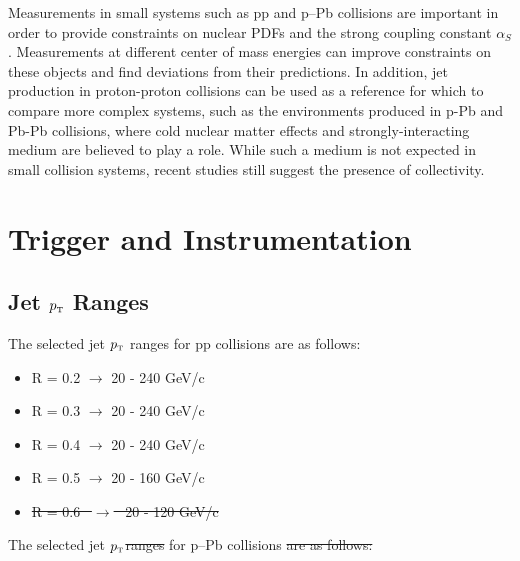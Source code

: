 \documentclass[ALICE]{ALICE_analysis_notes}
\newcommand{\pT}{$p_{\mbox{\tiny T}}$\xspace}
\newcommand{\pPb}{{\mbox{p--Pb}}\xspace}
\newcommand{\pp}{pp\xspace}
\providecommand{\DIFaddtex}[1]{{\protect\color{blue}\uwave{#1}}} %
\providecommand{\DIFdeltex}[1]{{\protect\color{red}\sout{#1}}}                      %
\providecommand{\DIFaddbegin}{} %
\providecommand{\DIFaddend}{} %
\providecommand{\DIFdelbegin}{} %
\providecommand{\DIFdelend}{} %
\providecommand{\DIFadd}[1]{\texorpdfstring{\DIFaddtex{#1}}{#1}} %
\providecommand{\DIFdel}[1]{\texorpdfstring{\DIFdeltex{#1}}{}} %
\newcommand{\DIFscaledelfig}{0.5}
\newlength{\DIFdelgraphicswidth} %
\newlength{\DIFdelgraphicsheight} %
\newcommand{\DIFaddincludegraphics}[2][]{{\color{blue}\fbox{\DIFOincludegraphics[#1]{#2}}}} %
\newcommand{\DIFdelincludegraphics}[2][]{%
\sbox{\DIFdelgraphicsbox}{\DIFOincludegraphics[#1]{#2}}%
\settoboxwidth{\DIFdelgraphicswidth}{\DIFdelgraphicsbox} %
\settoboxtotalheight{\DIFdelgraphicsheight}{\DIFdelgraphicsbox} %
\scalebox{\DIFscaledelfig}{%
\parbox[b]{\DIFdelgraphicswidth}{\usebox{\DIFdelgraphicsbox}\\[-\baselineskip] \rule{\DIFdelgraphicswidth}{0em}}\llap{\resizebox{\DIFdelgraphicswidth}{\DIFdelgraphicsheight}{%
\setlength{\unitlength}{\DIFdelgraphicswidth}%
\begin{picture}(1,1)%
\thicklines\linethickness{2pt} %
{\color[rgb]{1,0,0}\put(0,0){\framebox(1,1){}}}%
{\color[rgb]{1,0,0}\put(0,0){\line( 1,1){1}}}%
{\color[rgb]{1,0,0}\put(0,1){\line(1,-1){1}}}%
\end{picture}%
}\hspace*{3pt}}} %
} %
\DeclareRobustCommand{\DIFaddbegin}{\DIFOaddbegin \let\includegraphics\DIFaddincludegraphics} %
\DeclareRobustCommand{\DIFaddend}{\DIFOaddend \let\includegraphics\DIFOincludegraphics} %
\DeclareRobustCommand{\DIFdelbegin}{\DIFOdelbegin \let\includegraphics\DIFdelincludegraphics} %
\DeclareRobustCommand{\DIFdelend}{\DIFOaddend \let\includegraphics\DIFOincludegraphics} %
\begin{document}
Measurements in small systems such as pp and p--Pb collisions are important in order to provide constraints on nuclear PDFs and the strong coupling constant $\alpha_{S}$ \cite{CMSPDFConstraints}. Measurements at different center of mass energies can improve constraints on these objects and find deviations from their predictions. In addition, jet production in proton-proton collisions can be used as a reference for which to compare more complex systems, such as the environments produced in p-Pb and Pb-Pb collisions, where cold nuclear matter effects and strongly-interacting medium are believed to play a role. While such a medium is not expected in small collision systems, recent studies still suggest the presence of collectivity.\clearpage{}
\clearpage{}\section{Trigger and Instrumentation}
\label{chap:TriggerAndInstrumentation}

\subsection{Jet \pT Ranges}
\label{sec:ptRanges}

The selected jet \pT ranges for \pp collisions are as follows:

\begin{itemize}
    \item R = 0.2 $\rightarrow$ 20 - 240 GeV/c
    \item R = 0.3 $\rightarrow$ 20 - 240 GeV/c
    \item R = 0.4 $\rightarrow$ 20 - 240 GeV/c
    \item R = 0.5 $\rightarrow$ 20 - 160 GeV/c
\DIFdelbegin %
\item%
\DIFdel{R = 0.6 \mbox{%
$\rightarrow$
}%
20 - 120 GeV/c
}\DIFdelend \end{itemize}

The selected jet \pT \DIFdelbegin \DIFdel{ranges }\DIFdelend \DIFaddbegin \DIFadd{range }\DIFaddend for \pPb collisions \DIFdelbegin \DIFdel{are as follows:
}%
\end{document}
